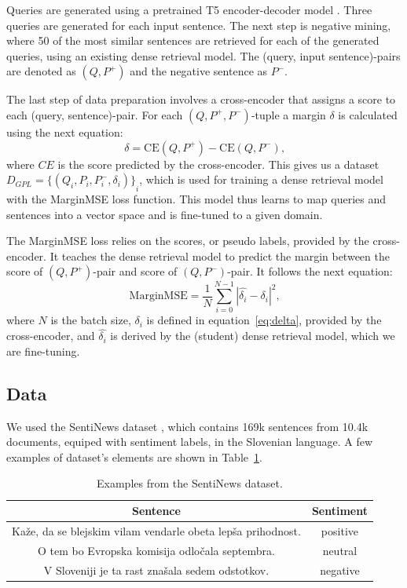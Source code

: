 \documentclass[fleqn,moreauthors,10pt]{ds_report}
\begin{document}
Queries are generated using a pretrained T5 encoder-decoder model \cite{T5}. Three queries are generated for each input sentence. The next step is negative mining, where 50 of the most similar sentences are retrieved for each of the generated queries, using an existing dense retrieval model. The (query, input sentence)-pairs are denoted as $(Q, P^{+})$ and the negative sentence as $P^{-}$.

The last step of data preparation involves a cross-encoder that assigns a score to each (query, sentence)-pair. For each $(Q, P^{+}, P^{-})$-tuple a margin $\delta$ is calculated using the next equation:
\begin{equation}
	\delta = \text{CE}(Q, P^{+}) - \text{CE}(Q, P^{-})\text{,}
\label{eq:delta}
\end{equation}
where $CE$ is the score predicted by the cross-encoder. This gives us a dataset $D_{GPL} = {\{ ( Q_i, P_i, P_i^{-}, \delta_i ) \}}_i$, which is used for training a dense retrieval model with the MarginMSE loss function. This model thus learns to map queries and sentences into a vector space and is fine-tuned to a given domain.

The MarginMSE loss \cite{marginMSE} relies on the scores, or pseudo labels, provided by the cross-encoder. It teaches the dense retrieval model to predict the margin between the score of $(Q, P^{+})$-pair and score of $(Q, P^{-})$-pair. It follows the next equation:
\begin{equation}
	\text{MarginMSE} = \frac{1}{N} \sum_{i=0}^{N-1} |\hat{\delta_i} - \delta_i|^{2} \text{,}
\label{eq:delta}
\end{equation}
where $N$ is the batch size, $\delta_i$ is defined in equation~\ref{eq:delta}, provided by the cross-encoder, and $\hat{\delta_i}$ is derived by the (student) dense retrieval model, which we are fine-tuning.


\subsection*{Data}
We used the SentiNews dataset \cite{sentiNews}, which contains 169k sentences from 10.4k documents, equiped with sentiment labels, in the Slovenian language. A few examples of dataset's elements are shown in Table~\ref{tab1}.

\begin{table}[!h]
	\footnotesize
	\begin{center}
		\begin{tabular}{ |c|c| } 
		\hline
		Sentence & Sentiment \\
		\hline
		
		Kaže, da se blejskim vilam vendarle obeta lepša prihodnost. & positive \\
		O tem bo Evropska komisija odločala septembra. &neutral\\
		V Sloveniji je ta rast znašala sedem odstotkov. &negative\\
		
		\hline
		\end{tabular}
	\end{center}
\caption{Examples from the SentiNews \cite{sentiNews} dataset.}
\label{tab1}
\end{table}
\end{document}
